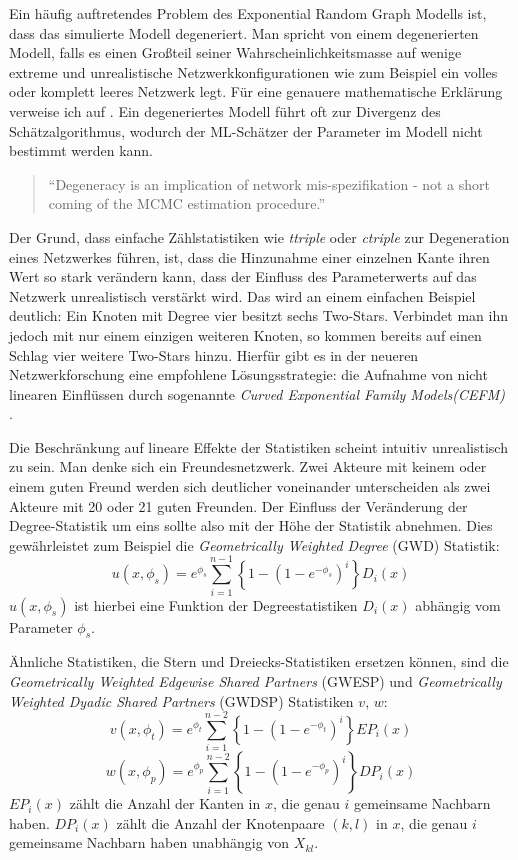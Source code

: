 \documentclass[a4paper,ngerman,oneside,titlepage,bibliography=totoc,11pt]{scrreprt}
\begin{document}
Ein häufig auftretendes Problem des Exponential Random Graph Modells ist, dass das simulierte Modell degeneriert. Man spricht von einem degenerierten Modell, falls es einen Großteil seiner Wahrscheinlichkeitsmasse auf wenige extreme und unrealistische Netzwerkkonfigurationen wie zum Beispiel ein volles oder komplett leeres Netzwerk legt. Für eine genauere mathematische Erklärung verweise ich auf \citet{handcock2003assessing}. Ein degeneriertes Modell führt oft zur Divergenz des Schätzalgorithmus, wodurch der ML-Schätzer der Parameter im Modell nicht bestimmt werden kann. 
\begin{quote}
"`Degeneracy is an implication of network mis-spezifikation - not a short coming of the MCMC estimation procedure."'\citep{handcock2008statnet}
\end{quote}
Der Grund, dass einfache Zählstatistiken wie \textit{ttriple} oder \textit{ctriple} zur Degeneration eines Netzwerkes führen, ist, dass die Hinzunahme einer einzelnen Kante ihren Wert so stark verändern kann, dass der Einfluss des Parameterwerts auf das Netzwerk unrealistisch verstärkt wird. Das wird an einem einfachen Beispiel deutlich: Ein Knoten mit Degree vier besitzt sechs Two-Stars. Verbindet man ihn jedoch mit nur einem einzigen weiteren Knoten, so kommen bereits auf einen Schlag vier weitere Two-Stars hinzu. Hierfür gibt es in der neueren Netzwerkforschung eine empfohlene Lösungsstrategie: die Aufnahme von nicht linearen Einflüssen durch sogenannte \emph{Curved Exponential Family Models(CEFM)} \citep{hunter2007curved}.

Die Beschränkung auf lineare Effekte der Statistiken scheint intuitiv unrealistisch zu sein. Man denke sich ein Freundesnetzwerk. Zwei Akteure mit keinem oder einem guten Freund werden sich deutlicher voneinander unterscheiden als zwei Akteure mit 20 oder 21 guten Freunden. Der Einfluss der Veränderung der Degree-Statistik um eins sollte also mit der Höhe der Statistik abnehmen. Dies gewährleistet zum Beispiel die \textit{Geometrically Weighted Degree} (GWD) Statistik:
\begin{equation}
	u(x, \phi_s) = e^{\phi_s} \sum^{n-1}_{i=1}\left\{1-(1-e^{-\phi_s})^{i}\right\}D_i(x)
	\label{eq:GWD}
\end{equation}
$u(x,\phi_s)$ ist hierbei eine Funktion der Degreestatistiken $D_i(x)$ abhängig vom Parameter $\phi_s$.

Ähnliche Statistiken, die Stern und Dreiecks-Statistiken ersetzen können, sind die \textit{Geometrically Weighted Edgewise Shared Partners} (GWESP) und \textit{Geometrically Weighted Dyadic Shared Partners} (GWDSP) Statistiken $v$, $w$:
\begin{equation}
	v(x, \phi_t) = e^{\phi_t} \sum^{n-2}_{i=1}\left\{1-(1-e^{-\phi_t})^{i}\right\}EP_i(x)
	\label{eq:GWESP}
\end{equation}
\begin{equation}
	w(x, \phi_p) = e^{\phi_p} \sum^{n-2}_{i=1}\left\{1-(1-e^{-\phi_p})^{i}\right\}DP_i(x)
	\label{eq:GWDSP}
\end{equation}
$EP_i(x)$ zählt die Anzahl der Kanten in $x$, die genau $i$ gemeinsame Nachbarn haben. $DP_i(x)$ zählt die Anzahl der Knotenpaare $(k,l)$ in $x$, die genau $i$ gemeinsame Nachbarn haben unabhängig von $X_{kl}$.
\end{document}
